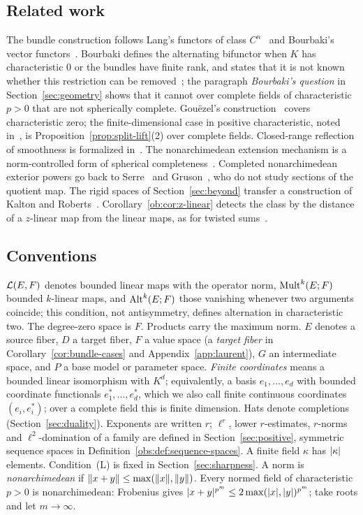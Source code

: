 \subsection*{Related work}
The bundle construction follows Lang's functors of class $C^n$~\cite[Ch.~III, \S4]{La} and Bourbaki's vector
functors~\cite[n\textsuperscript{o}~7.6]{Bou}. Bourbaki defines the alternating bifunctor when $K$ has characteristic
$0$ or the bundles have finite rank, and states that it is not known whether this restriction can be
removed~\cite[n\textsuperscript{o}~7.8]{Bou}; the paragraph \emph{Bourbaki's question} in Section~\ref{sec:geometry}
shows that it cannot over complete fields of characteristic $p>0$ that are not spherically complete. Gou\"ezel's
construction~\cite{G1,G2} covers characteristic zero; the finite-dimensional case in positive characteristic, noted
in~\cite{G1}, is Proposition~\ref{prop:split-lift}(2) over complete fields. Closed-range reflection of smoothness is
formalized in~\cite{PR}. The nonarchimedean extension mechanism is a norm-controlled form of spherical
completeness~\cite{In,Schi,Sch,Yuan}. Completed nonarchimedean exterior powers go back to Serre~\cite{Se} and
Gruson~\cite{Gr}, who do not study sections of the quotient map. The rigid spaces of Section~\ref{sec:beyond} transfer a construction of Kalton and Roberts~\cite{KR}.
Corollary~\ref{ob:cor:z-linear} detects the class by the distance of a $z$-linear map from the linear maps, as for
twisted sums~\cite{Ka,KP,CSC}.

\subsection*{Conventions}
$\mathcal L(E,F)$ denotes bounded linear maps with the operator norm, $\operatorname{Mult}^k(E;F)$ bounded $k$-linear maps, and
$\operatorname{Alt}^k(E;F)$ those vanishing whenever two arguments coincide; this condition, not antisymmetry, defines alternation
in characteristic two. The degree-zero space is $F$. Products carry the maximum norm. $E$ denotes a source fiber, $D$
a target fiber, $F$ a value space (a \emph{target fiber} in Corollary~\ref{cor:bundle-cases} and
Appendix~\ref{app:laurent}), $G$ an intermediate space, and $P$ a base model or parameter space. \emph{Finite
coordinates} means a bounded linear isomorphism with $K^d$; equivalently, a basis $e_1,\ldots,e_d$ with bounded coordinate functionals $e^*_1,\ldots,e^*_d$, which we also call finite continuous coordinates $(e_i,e^*_i)$; over a complete field this is finite dimension. Hats
denote completions (Section~\ref{sec:duality}). Exponents are written $r$; $\ell^r$, lower $r$-estimates, $r$-norms
and $\ell^2$-domination of a family are defined in Section~\ref{sec:positive}, symmetric sequence spaces in
Definition~\ref{obs:def:sequence-spaces}. A finite field $\kappa$ has $\lvert \kappa\rvert$ elements. Condition~\textup{(L)} is
fixed in Section~\ref{sec:sharpness}. A norm is \emph{nonarchimedean} if $\lVert x+y\rVert\le\max(\lVert x\rVert,\lVert y\rVert)$. Every
normed field of characteristic $p>0$ is nonarchimedean: Frobenius gives $\lvert x+y\rvert^{p^m}\le2\max(\lvert x\rvert,\lvert y\rvert)^{p^m}$; take roots
and let $m\to\infty$.

